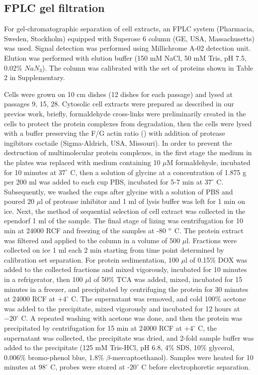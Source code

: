 \documentclass[alpha-refs]{wiley-article}
\begin{document}
\subsection{FPLC gel filtration}

For gel-chromatographic separation of cell extracts, an FPLC system (Pharmacia, Sweden, Stockholm) equipped with Superose 6 column (GE, USA, Massachusetts) was used.
Signal detection was performed using Millichrome A-02 detection unit.
Elution was performed with elution buffer (150 mM NaCl, 50 mM Tris, pH 7.5, 0.02\% $NaN_3$).
The column was calibrated with the set of proteins shown in Table 2 in Supplementary.

Cells were grown on 10 cm dishes (12 dishes for each passage) and lysed at passages 9, 15, 28.
Cytosolic cell extracts were prepared as described in our previos work, briefly, formaldehyde cross-links were preliminarily created in the cells to protect the protein complexes from degradation, then the cells were lysed with a buffer preserving the F/G actin ratio (\cite{bobkov2017effect}) with addition of protease ingibitors coctaile (Sigma-Aldrich, USA, Missouri).
In order to prevent the destruction of multimolecular protein complexes, in the first stage the medium in the plates was replaced with medium containing 10 $\mu$M formaldehyde, incubated for 10 minutes at $37^{\circ}$ C, then a solution of glycine at a concentration of 1.875 g per 200 ml was added to each cup PBS, incubated for 5-7 min at  $37^{\circ}$  C.
Subsequently, we washed the cups after glycine with a solution of PBS and poured 20 $\mu$l of protease inhibitor and 1 ml of lysis buffer was left for 1 min on ice.
Next, the method of sequential selection of cell extract was collected in the ependorf 1 ml of the sample.
The final stage of lizing was centrifugation for 10 min at 24000 RCF and freezing of the samples at -80 $\degree$ C.
The protein extract was filtered and applied to the column in a volume of 500 $\mu$l.
Fractions were collected on ice 1 ml each 2 min starting from time point determined by calibration set separation.
For protein sedimentation, 100 $\mu$l of 0.15\% DOX was added to the collected fractions and mixed vigorously, incubated for 10 minutes in a refrigerator, then 100 $\mu$l of 50\% TCA was added, mixed, incubated for 15 minutes in a freezer, and precipitated by centrifuging the protein for 30 minutes at 24000 RCF at $+4^{\circ}$ C.
The supernatant was removed, and cold 100\% acetone was added to the precipitate, mixed vigorously and incubated for 12 hours at $-20^{\circ}$ C.
A repeated washing with acetone was done, and then the protein was precipitated by centrifugation for 15 min at 24000 RCF at $+4^{\circ}$ C, the supernatant was collected, the precipitate was dried, and 2-fold sample buffer was added to the precipitate (125 mM Tris-HCl, pH 6.8, 4\% SDS, 10\% glycerol, 0.006\% bromo-phenol blue, 1.8\% $\beta$-mercaptoethanol).
Samples were heated for 10 minutes at $98^{\circ}$ C, probes were stored at -$20^{\circ}$ C before electrophoretic separation.
\end{document}
